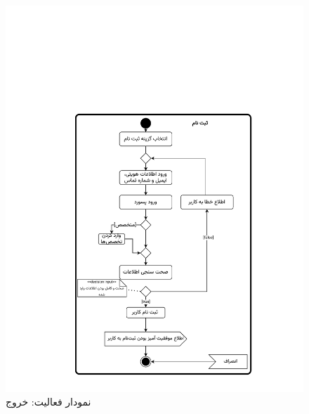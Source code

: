 \begin{figure}
	\centering
	\includegraphics[scale=0.8, page=3]{figs/OOD-activity1-10.pdf}
	\caption{نمودار فعالیت: خروج}
\end{figure}
\FloatBarrier
\newpage


